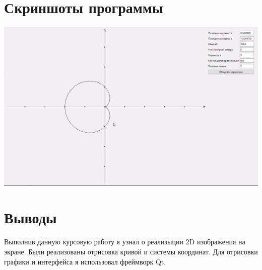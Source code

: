 \section{Скриншоты программы}
\includegraphics[scale=0.6]{L1_1.png}
\section{Выводы}
Выполнив данную курсовую работу я узнал о реализыции 2D изображения на экране. Были 
реализованы отрисовка кривой и системы координат. Для отрисовки графики и интерфейса
я использовал фреймворк Qt.
\pagebreak
